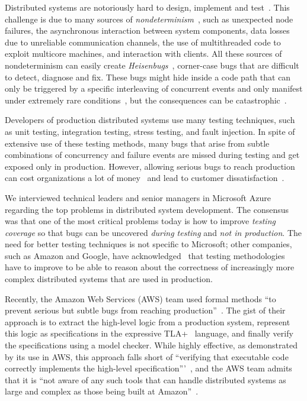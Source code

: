 Distributed systems are notoriously hard to design, implement and test~\cite{cavage2013there, leesatapornwongsa2014samc, gunawi2014cbs, laguna2015debugging, maddox2015test}. This challenge is due to many sources of \emph{nondeterminism}~\cite{chandra2007paxos, henry2009cloud, leesatapornwongsa2016taxdc}, such as unexpected node failures, the asynchronous interaction between system components, data losses due to unreliable communication channels, the use of multithreaded code to exploit multicore machines, and interaction with clients. All these sources of nondeterminism can easily create \emph{Heisenbugs}~\cite{gray1986computers, musuvathi2008finding}, corner-case bugs that are difficult to detect, diagnose and fix. These bugs might hide inside a code path that can only be triggered by a specific interleaving of concurrent events and only manifest under extremely rare conditions~\cite{gray1986computers, musuvathi2008finding}, but the consequences can be catastrophic~\cite{amazon2012aws, google2014outage}.

Developers of production distributed systems use many testing techniques, such as unit testing, integration testing, stress testing, and fault injection. In spite of extensive use of these testing methods, many bugs that arise from subtle combinations of concurrency and failure events are missed during testing and get exposed only in production. However, allowing serious bugs to reach production can cost organizations a lot of money~\cite{tassey2002economic} and lead to customer dissatisfaction~\cite{amazon2012aws, google2014outage}.

We interviewed technical leaders and senior managers in Microsoft Azure regarding the top problems in distributed system development. The consensus was that one of the most critical problems today is how to improve \emph{testing coverage} so that bugs can be uncovered \emph{during testing} and \emph{not in production}. The need for better testing techniques is not specific to Microsoft; other companies, such as Amazon and Google, have acknowledged~\cite{chandra2007paxos,newcombe2015aws} that testing methodologies have to improve to be able to reason about the correctness of increasingly more complex distributed systems that are used in production.

Recently, the Amazon Web Services (AWS) team used formal methods ``to prevent serious but subtle bugs from reaching production''~\cite{newcombe2015aws}. The gist of their approach is to extract the high-level logic from a production system, represent this logic as specifications in the expressive TLA+~\cite{lamport1994temporal} language, and finally verify the specifications using a model checker. While highly effective, as demonstrated by its use in AWS, this approach falls short of ``verifying that executable code correctly implements the high-level specification'''~\cite{newcombe2015aws}, and the AWS team admits that it is ``not aware of any such tools that can handle distributed systems as large and complex as those being built at Amazon''~\cite{newcombe2015aws}.

